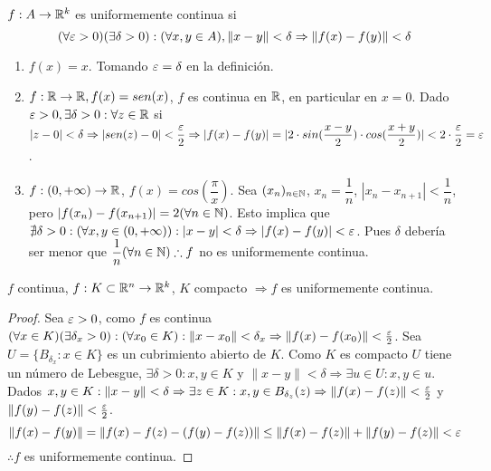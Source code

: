 \begin{definition}
  $f: A \to \mathbb{R}^k$ es uniformemente continua si \begin{equation}
    (\forall \varepsilon > 0)(\exists \delta > 0) : (\forall x,y \in A), \|x-y\| < \delta \Rightarrow \|f(x) - f(y)\| < \delta
  \end{equation}
\end{definition}

\begin{eg}
  \begin{enumerate}
    \item $f(x) = x$. Tomando $\varepsilon = \delta$ en la definición.
    \item $f: \mathbb{R} \to \mathbb{R}, f(x) = sen(x)$, $f$ es continua en $\mathbb{R}$, en particular en $x = 0$. Dado $\varepsilon > 0, \exists \delta > 0 : \forall z \in \mathbb{R}$ si $|z-0| < \delta \Rightarrow |sen(z) - 0| < \dfrac{\varepsilon}{2} \Rightarrow |f(x) - f(y)| = |2 \cdot sin(\dfrac{x-y}{2}) \cdot cos(\dfrac{x+y}{2})| < 2 \cdot \dfrac{\varepsilon}{2} = \varepsilon$.
    \item $f: (0, +\infty) \to \mathbb{R}$, $f(x) = cos(\dfrac{\pi}{x})$. Sea $(x_n)_{n \in \mathbb{N}}$, $x_n = \dfrac{1}{n}$, $|x_n - x_{n+1}| < \dfrac{1}{n}$, pero $|f(x_n) - f(x_{n+1})| = 2 (\forall n \in \mathbb{N})$. Esto implica que $\nexists \delta > 0 : (\forall x,y \in (0, +\infty)) : |x-y| < \delta \Rightarrow |f(x) - f(y)| < \varepsilon$. Pues $\delta$ debería ser menor que $\dfrac{1}{n} (\forall n \in \mathbb{N}) \therefore f$ no es uniformemente continua.
  \end{enumerate}
\end{eg}

\begin{theorem}
  $f$ continua, $f: K \subset \mathbb{R}^n \to \mathbb{R}^k$, $K$ compacto $\Rightarrow f$ es uniformemente continua.
  \begin{proof}
    Sea $\varepsilon > 0$, como $f$ es continua $(\forall x \in K)(\exists \delta_x > 0) : (\forall x_0 \in K) : \|x - x_0\| < \delta_x \Rightarrow \|f(x) - f(x_0)\| < \frac{\varepsilon}{2}$. Sea $U = \{B_{\delta_x} : x \in K\}$ es un cubrimiento abierto de $K$. Como $K$ es compacto $U$ tiene un número de Lebesgue, $\exists \delta > 0 : x, y \in K$ y $ \|x-y\| < \delta \Rightarrow \exists u \in U : x, y \in u$. Dados $x, y \in K : \|x-y\| < \delta \Rightarrow \exists z \in K : x, y \in B_{\delta_z}(z) \Rightarrow \|f(x) - f(z)\| < \frac{\varepsilon}{2}$ y $\|f(y) - f(z)\| < \frac{\varepsilon}{2}$. 
    \begin{equation}
      \|f(x) - f(y)\| = \|f(x) - f(z) - (f(y) - f(z))\| \leq \|f(x) - f(z)\| + \|f(y) - f(z)\| < \varepsilon
    \end{equation} $\therefore f$ es uniformemente continua.
  \end{proof}
\end{theorem}

